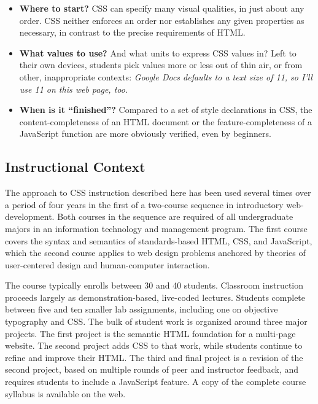 \documentclass[sigplan,screen]{acmart}
\begin{document}
\begin{itemize}
  \item \textbf{Where to start?} CSS can specify many visual qualities,  in just about any order. CSS neither enforces an order nor establishes any given properties as necessary, in contrast to the precise requirements of HTML.
  \item \textbf{What values to use?} And what units to express CSS values in? Left to their own devices, students pick values more or less out of thin air, or from other, inappropriate contexts: {\itshape Google Docs defaults to a text size of 11, so I’ll use 11 on this web page, too.}
  \item \textbf{When is it “finished”?} Compared to a set of style declarations in CSS, the content-completeness of an HTML document or the feature-completeness of a JavaScript function are more obviously verified, even by beginners.
\end{itemize}




\subsection{Instructional Context}
The approach to CSS instruction described here has been used several times over a period of four years in the first of a two-course sequence in introductory web-development. Both courses in the sequence are required of all undergraduate majors in an information technology and management program. The first course covers the syntax and semantics of standards-based HTML, CSS, and JavaScript, which the second course applies to web design problems anchored by theories of user-centered design and human-computer interaction.

The course typically enrolls between 30 and 40 students. Classroom instruction proceeds largely as demonstration-based, live-coded lectures. Students complete between five and ten smaller lab assignments, including one on objective typography and CSS. The bulk of student work is organized around three major projects. The first project is the semantic HTML foundation for a multi-page website. The second project adds CSS to that work, while students continue to refine and improve their HTML. The third and final project is a revision of the second project, based on multiple rounds of peer and instructor feedback, and requires students to include a JavaScript feature. A copy of the complete course syllabus is available on the web\cite{kas:fwd}.
\end{document}
